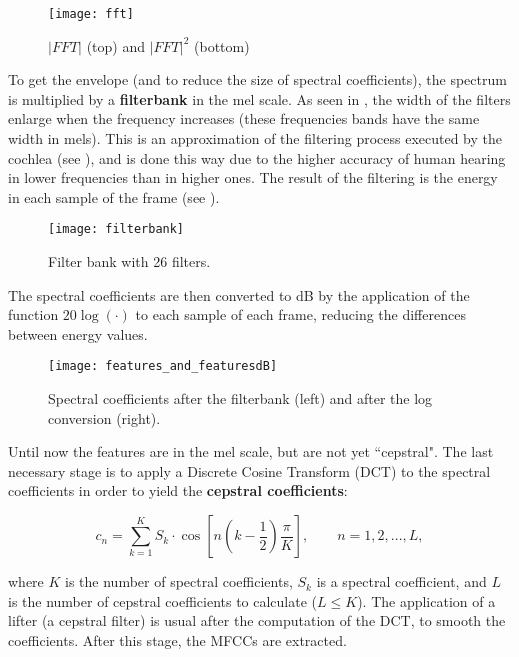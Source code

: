 \begin{figure}[ht]
    \centering
    \texttt{[image: fft]}
    \caption{$|FFT|$ (top) and $|FFT|^2$ (bottom)}
    \label{fig:fft}
\end{figure}


To get the envelope (and to reduce the size of spectral coefficients), the spectrum is multiplied by a \textbf{filterbank} in the mel scale. As seen in , the width of the filters enlarge when the frequency increases (these frequencies bands have the same width in mels). This is an approximation of the filtering process executed by the cochlea (see ), and is done this way due to the higher accuracy of human hearing in lower frequencies than in higher ones. The result of the filtering is the energy in each sample of the frame (see ).

\begin{figure}[ht]
    \centering
    \texttt{[image: filterbank]}
    \caption{Filter bank with 26 filters.}
    \label{fig:filterbank}
\end{figure}


The spectral coefficients are then converted to dB by the application of the function $20\log(\cdot)$ to each sample of each frame, reducing the differences between energy values.

\begin{figure}[ht]
    \centering
    \texttt{[image: features\_and\_featuresdB]}
    \caption{Spectral coefficients after the filterbank (left) and after the log conversion (right).}
    \label{fig:features_and_featuresdB}
\end{figure}


Until now the features are in the mel scale, but are not yet ``cepstral". The last necessary stage is to apply a Discrete Cosine Transform (DCT) to the spectral coefficients in order to yield the \textbf{cepstral coefficients}:

\begin{equation}
    c_n = \sum_{k=1}^K S_k\cdot\cos\left[n\left(k - \frac{1}{2}\right)\frac{\pi}{K}\right],\qquad n = 1, 2, ..., L,
    \label{eq:dct}
\end{equation}

\noindent where $K$ is the number of spectral coefficients, $S_k$ is a spectral coefficient, and $L$ is the number of cepstral coefficients to calculate ($L \leq K$). The application of a lifter (a cepstral filter) is usual after the computation of the DCT, to smooth the coefficients. After this stage, the MFCCs are extracted.

